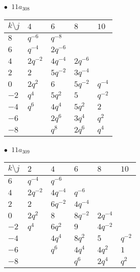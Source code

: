 \begin{minipage}{\linewidth}
$\bullet\ $ $11a_{308}$ \vspace{0.5em} \\
\begin{tabular}{l|llll}
$k \setminus j$ & $4$ & $6$ & $8$ & $10$ \\
\hline
$8$ & $q^{-6}$ & $q^{-8}$ &  &  \\
$6$ & $q^{-4}$ & $2q^{-6}$ &  &  \\
$4$ & $2q^{-2}$ & $4q^{-4}$ & $2q^{-6}$ &  \\
$2$ & $2$ & $5q^{-2}$ & $3q^{-4}$ &  \\
$0$ & $2q^{2}$ & $6$ & $5q^{-2}$ & $q^{-4}$ \\
$-2$ & $q^{4}$ & $5q^{2}$ & $5$ & $q^{-2}$ \\
$-4$ & $q^{6}$ & $4q^{4}$ & $5q^{2}$ & $2$ \\
$-6$ &  & $2q^{6}$ & $3q^{4}$ & $q^{2}$ \\
$-8$ &  & $q^{8}$ & $2q^{6}$ & $q^{4}$ \\
\end{tabular}
\vspace{2em}
\end{minipage}
%
\begin{minipage}{\linewidth}
$\bullet\ $ $11a_{309}$ \vspace{0.5em} \\
\begin{tabular}{l|lllll}
$k \setminus j$ & $2$ & $4$ & $6$ & $8$ & $10$ \\
\hline
$6$ & $q^{-4}$ & $q^{-6}$ &  &  &  \\
$4$ & $2q^{-2}$ & $4q^{-4}$ & $q^{-6}$ &  &  \\
$2$ & $2$ & $6q^{-2}$ & $4q^{-4}$ &  &  \\
$0$ & $2q^{2}$ & $8$ & $8q^{-2}$ & $2q^{-4}$ &  \\
$-2$ & $q^{4}$ & $6q^{2}$ & $9$ & $4q^{-2}$ &  \\
$-4$ &  & $4q^{4}$ & $8q^{2}$ & $5$ & $q^{-2}$ \\
$-6$ &  & $q^{6}$ & $4q^{4}$ & $4q^{2}$ & $1$ \\
$-8$ &  &  & $q^{6}$ & $2q^{4}$ & $q^{2}$ \\
\end{tabular}
\vspace{2em}
\end{minipage}
%
